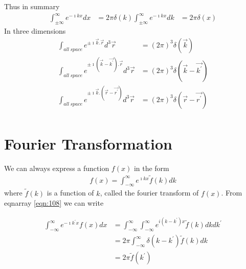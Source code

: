 		Thus in summary
		\begin{eqnarray}\label{eqn:103-104}
			\int_{\pm \infty}^{\infty} e^{-\imath k x} dx &= 2\pi \delta(k)
			\int_{\pm \infty}^{\infty} e^{-\imath k x} dk &= 2\pi \delta(x)
		\end{eqnarray}
		In three dimensions
		\begin{eqnarray}\label{eqn:105-107}
			\int_{all\ space} e^{\pm \imath \vec{k} . \vec{r}} d^3\vec{r} &= (2\pi)^3 \delta(\vec{k}) \\
			\int_{all\ space} e^{\pm \imath (\vec{k} - \vec{k^\prime}) . \vec{r}} d^3\vec{r} &= (2\pi)^3 \delta(\vec{k} - \vec{k^\prime}) \\
			\int_{all\ space} e^{\pm \imath \vec{k} . (\vec{r} - \vec{r^\prime})} d^3\vec{r} &= (2\pi)^3 \delta(\vec{r} - \vec{r^\prime}) \\
		\end{eqnarray}
		
	\section{Fourier Transformation}
		We can always express a function $f(x)$ in the form
		\begin{eqnarray}\label{eqn:108}
			f(x) = \int_{-\infty}^{\infty} e^{\imath k x} \tilde{f}(k) dk
		\end{eqnarray}
		where $\tilde{f}(k)$ is a function of $k$, called the fourier transform of $f(x)$. From eqnarray \ref{eqn:108} we can write
		
		\begin{eqnarray}\label{eqn:109}
			\int_{-\infty}^{\infty} e^{-\imath k^\prime x} f(x) dx 
			&= \int_{-\infty}^{\infty} \int_{-\infty}^{\infty} e^{i(k-k^\prime) x} \tilde{f}(k) dk dk^\prime \nonumber \\
			&= 2 \pi \int_{-\infty}^{\infty} \delta(k-k^\prime) \tilde{f}(k) dk \nonumber \\
			&= 2\pi \tilde{f}(k^\prime) 
		\end{eqnarray}
		

